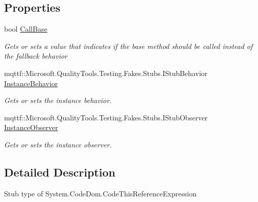 \subsection*{Properties}
\begin{DoxyCompactItemize}
\item 
bool \hyperlink{class_system_1_1_code_dom_1_1_fakes_1_1_stub_code_this_reference_expression_aba75761891a39f3b8f676a6b51df2379}{Call\-Base}
\begin{DoxyCompactList}\small\item\em Gets or sets a value that indicates if the base method should be called instead of the fallback behavior\end{DoxyCompactList}\item 
mqttf\-::\-Microsoft.\-Quality\-Tools.\-Testing.\-Fakes.\-Stubs.\-I\-Stub\-Behavior \hyperlink{class_system_1_1_code_dom_1_1_fakes_1_1_stub_code_this_reference_expression_a07989292c97027d286ec0bebe208924e}{Instance\-Behavior}
\begin{DoxyCompactList}\small\item\em Gets or sets the instance behavior.\end{DoxyCompactList}\item 
mqttf\-::\-Microsoft.\-Quality\-Tools.\-Testing.\-Fakes.\-Stubs.\-I\-Stub\-Observer \hyperlink{class_system_1_1_code_dom_1_1_fakes_1_1_stub_code_this_reference_expression_a68254101d8726045b862e46039627f7d}{Instance\-Observer}
\begin{DoxyCompactList}\small\item\em Gets or sets the instance observer.\end{DoxyCompactList}\end{DoxyCompactItemize}


\subsection{Detailed Description}
Stub type of System.\-Code\-Dom.\-Code\-This\-Reference\-Expression



